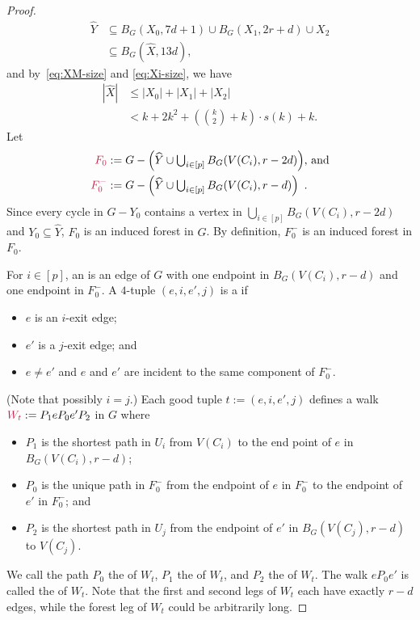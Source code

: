 \documentclass{patmorin}
\newcommand{\piotr}[1]{\textcolor{red}{Piotr: #1}}
\begin{document}
\begin{proof}
\begin{equation}
\begin{split}
\widehat{Y}&\textstyle\subseteq B_G(X_0,7d+1) \cup B_G(X_1,2r+d) \cup X_2\\
&\subseteq B_G(\widehat{X}, 13d), 
\end{split} 
\end{equation}
and by~\eqref{eq:XM-size} and \eqref{eq:Xi-size},  we have 
\begin{equation}
\begin{split}
|\widehat{X}|& \textstyle \leq |X_0| + |X_1| + |X_2|  \\
&\textstyle< k + 2k^2+(\binom{k}{2}+k)\cdot s(k) + k. %
\end{split} \label{x_prime_size}
\end{equation}
Let
\begin{align*}
\mathdefin{F_0}&:=\textstyle{G-\left(\widehat{Y}\cup \bigcup_{i\in[p]} B_G(V(C_i),r-2d)\right)}\text{, and}\\
\mathdefin{F^-_0}&:=\textstyle{G-\left(\widehat{Y}\cup \bigcup_{i\in[p]} B_G(V(C_i),r-d)\right)} \enspace . 
\end{align*}
Since every cycle in $G-Y_0$ contains a vertex in $\bigcup_{i\in[p]} B_G(V(C_i),r-2d)$ and $Y_0\subseteq \widehat{Y}$, $F_0$ is an induced forest in $G$. By definition, $F^-_0$  is an induced forest in $F_0$.

For $i\in[p]$, an  is an edge of $G$ with one endpoint in $B_G(V(C_i),r-d)$ and one endpoint in $F_0^-$.
A $4$-tuple $(e,i,e',j)$ is a  if
\begin{itemize}[noitemsep,nosep]
  \item $e$ is an $i$-exit edge;
  \item $e'$ is a $j$-exit edge;
  and \item $e\neq e'$ and $e$ and $e'$ are incident to the same component of $F_0^-$.
\end{itemize}
(Note that possibly $i=j$.) 
Each good tuple $t:=(e,i,e',j)$  defines a walk $\mathdefin{W_t}:=P_1eP_0e'P_2$ in $G$ where
\begin{itemize}[noitemsep,nosep]
  \item $P_1$ is the shortest path in $U_i$ from $V(C_i)$ to the end point of $e$ in $B_G(V(C_i),r-d)$;
  \item $P_0$ is the unique path in $F_0^-$ from the endpoint of $e$ in $F^-_0$ to the endpoint of $e'$ in $F^-_0$; and
  \item $P_2$ is the shortest path in $U_j$ from the endpoint of $e'$ in $B_G(V(C_j),r-d)$ to $V(C_j)$.
\end{itemize}
We call the path $P_0$ the  of $W_t$, $P_1$ the  of $W_t$, and $P_2$ the  of $W_t$.  The walk $eP_0e'$ is called the  of $W_t$.  Note that the first and second legs of $W_t$ each have exactly $r-d$ edges, while the forest leg of $W_t$ could be arbitrarily long.


\end{proof}
\end{document}
